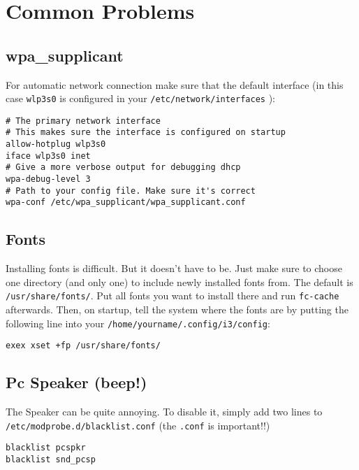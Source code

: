 \documentclass{article}
\begin{document}
\section{Common Problems}
\subsection{wpa\_supplicant}
For automatic network connection make sure that the default interface 
(in this case \verb`wlp3s0` is configured in your \verb`/etc/network/interfaces`
):
\begin{lstlisting}
# The primary network interface
# This makes sure the interface is configured on startup
allow-hotplug wlp3s0
iface wlp3s0 inet
# Give a more verbose output for debugging dhcp
wpa-debug-level 3
# Path to your config file. Make sure it's correct
wpa-conf /etc/wpa_supplicant/wpa_supplicant.conf
\end{lstlisting}

\subsection{Fonts}
Installing fonts is difficult. But it doesn't have to be. Just make sure to
choose one directory (and only one) to include newly installed fonts from.
The default is \\ \verb`/usr/share/fonts/`. Put all fonts you want to install there
and run \verb'fc-cache' afterwards. Then, on startup, tell the system where the fonts
are by putting the following line into your \verb`/home/yourname/.config/i3/config`:
\begin{lstlisting}
exex xset +fp /usr/share/fonts/
\end{lstlisting}

\subsection{Pc Speaker (beep!)}
The Speaker can be quite annoying. To disable it, simply add two lines to \\
\verb`/etc/modprobe.d/blacklist.conf` (the \verb`.conf` is important!!)
\begin{lstlisting}
blacklist pcspkr
blacklist snd_pcsp
\end{lstlisting}
\end{document}
